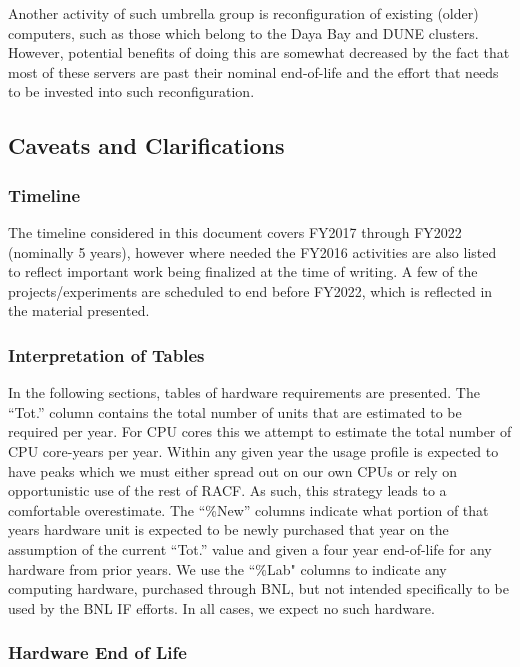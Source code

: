 \documentclass[pdftex,12pt,letter]{article}
\begin{document}

Another activity of such umbrella group is reconfiguration of existing (older) computers,
such as those which belong to the Daya Bay and DUNE clusters. However, potential benefits of doing
this are somewhat decreased by the fact that most of these servers are past their nominal
end-of-life and the effort that needs to be invested into such reconfiguration.

\subsection{Caveats and Clarifications}

\subsubsection{Timeline}
The timeline considered in this document covers FY2017 through FY2022 (nominally 5 years), however where needed
the FY2016 activities are also listed to reflect important work being finalized at the time of writing.
A few of the projects/experiments are scheduled to end before FY2022, which is reflected in the material presented.

\subsubsection{Interpretation of Tables}

In the following sections, tables of hardware
requirements are presented.
The ``Tot.'' column contains the total number of units that are
estimated to be required per year.
For CPU cores this we attempt to estimate the total number of CPU
core-years per year.
Within any given year the usage profile is expected to have peaks
which we must either spread out on our own CPUs or rely on
opportunistic use of the rest of RACF.
As such, this strategy leads to a comfortable overestimate. 
The ``\%New'' columns indicate what portion of that years hardware
unit is expected to be newly purchased that year on the assumption of
the current ``Tot.'' value and given a four year end-of-life for any
hardware from prior years.
We use the ``\%Lab" columns to indicate any computing hardware,
purchased through BNL, but not intended specifically to be used by the
BNL IF efforts. In all cases, we expect no such hardware.

\subsubsection{Hardware End of Life}
\end{document}

